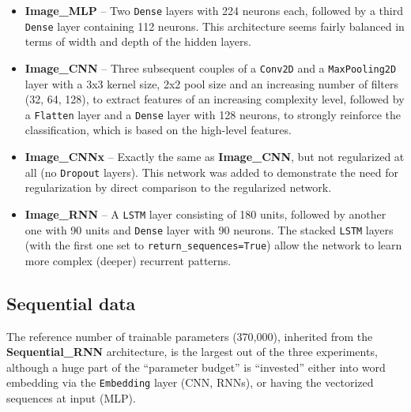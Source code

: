 \begin{itemize}
    \item \textbf{Image\_MLP} -- Two \texttt{Dense} layers with 224 neurons each, followed by a third
    \texttt{Dense} layer containing 112 neurons.
    This architecture seems fairly balanced in terms of width and depth of the hidden layers.
    \item \textbf{Image\_CNN} -- Three subsequent couples of a \texttt{Conv2D} and a \texttt{MaxPooling2D}
    layer with a 3x3 kernel size, 2x2 pool size and an increasing number of filters (32, 64, 128),
    to extract features of an increasing complexity level,
    followed by a \texttt{Flatten} layer and a \texttt{Dense} layer with 128 neurons, to strongly
    reinforce the classification, which is based on the high-level features.
    \item \textbf{Image\_CNNx} -- Exactly the same as \textbf{Image\_CNN}, but not regularized at all (no
    \texttt{Dropout} layers).
    This network was added to demonstrate the need for regularization by direct comparison to the regularized
    network.
    \item \textbf{Image\_RNN} -- A \texttt{LSTM} layer consisting of 180 units, followed by another one
    with 90 units and \texttt{Dense} layer with 90 neurons. The stacked \texttt{LSTM} layers (with the first
    one set to \texttt{return\_sequences=True}) allow the network to learn more complex (deeper) recurrent
    patterns.
\end{itemize}

\subsection{Sequential data}
\label{architectures-sequential}
The reference number of trainable parameters (370,000), inherited from the \textbf{Sequential\_RNN} architecture,
is the largest out of the three experiments, although a huge part of the ``parameter budget'' is ``invested''
either into
word embedding via the \texttt{Embedding} layer (CNN, RNNs), or having the vectorized sequences
at input (MLP).

